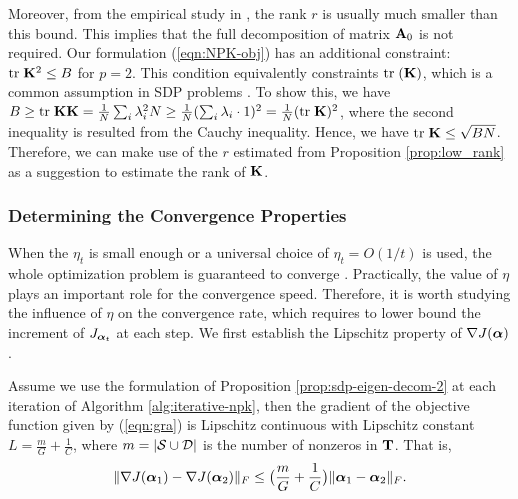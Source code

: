 Moreover, from the empirical study in \cite{mp/AlizadehHO97}, the rank $r$ is
usually much smaller than this bound. This implies that the full decomposition of
matrix ${\bf A}_0$ is not required. Our formulation (\ref{eqn:NPK-obj}) has an additional
constraint: ${\mbox{tr}\;}{\bf K}^2\leq B$ for $p=2$. This condition equivalently constraints
${\mbox{tr}\;}({\bf K})$, which is a common assumption in SDP
problems \cite{oms/KrishynanM06}. To show this, we have $B \geq {\mbox{tr}\;}{\bf K}{\bf K} =
\frac{1}{N}\sum_i \lambda_i^2 N \geq \frac{1}{N}(\sum_i \lambda_i\cdot 1)^2 =
\frac{1}{N}({\mbox{tr}\;}{\bf K})^2$, where the second inequality is resulted from the Cauchy
inequality. Hence, we have ${\mbox{tr}\;} {\bf K}\leq \sqrt{BN}$. Therefore, we can make use of
the $r$ estimated from Proposition \ref{prop:low_rank} as a suggestion to estimate the rank of ${\bf K}$.

\subsubsection{Determining the Convergence Properties}

When the $\eta_t$ is small enough or a universal choice of $\eta_t=O(1/t)$ is used, the
whole optimization problem is guaranteed to converge \cite{siam/BoydX05}.
Practically, the value of $\eta$ plays an important role for the convergence speed.
Therefore, it is worth studying the influence of $\eta$ on the convergence rate, which
requires to lower bound the increment of $J_{{\boldsymbol{\alpha}}_t}$ at each step. We first establish
the Lipschitz property of $\nabla J({\boldsymbol{\alpha}})$.

\begin{lemma}\label{prop:lipschitz}
Assume we use the formulation of Proposition \ref{prop:sdp-eigen-decom-2} at each
iteration of Algorithm \ref{alg:iterative-npk}, then the gradient of the objective
function given by (\ref{eqn:gra}) is Lipschitz continuous with Lipschitz constant $ L
= \frac{m}{G} + \frac{1}{C}$, where $m = |\cal S \cup \cal D|$ is the number of
nonzeros in ${\bf T}$. That is,
\[
\| \nabla J({\boldsymbol{\alpha}}_1) - \nabla J({\boldsymbol{\alpha}}_2) \|_F \leq
\big(\frac{m}{G} + \frac{1}{C}\big)\| {\boldsymbol{\alpha}}_1 - {\boldsymbol{\alpha}}_2 \|_F.
\]
\end{lemma}

